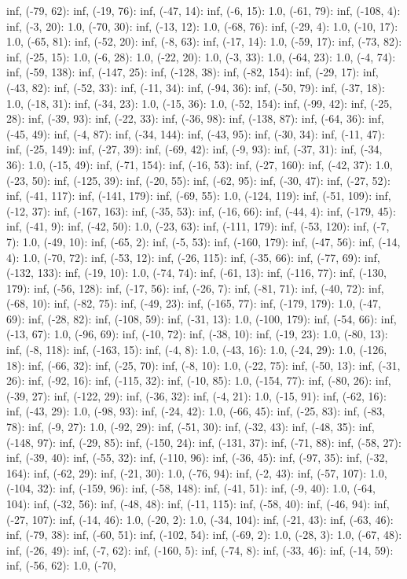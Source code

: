 \documentclass[parskip=half]{scrartcl}
\begin{document}
inf, (-79, 62): inf, (-19, 76): inf, (-47, 14): inf, (-6, 15): 1.0, (-61, 79): inf, (-108, 4): inf, (-3, 20): 1.0, (-70, 30): inf, (-13, 12): 1.0, (-68, 76): inf, (-29, 4): 1.0, (-10, 17): 1.0, (-65, 81): inf, (-52, 20): inf, (-8, 63): inf, (-17, 14): 1.0, (-59, 17): inf, (-73, 82): inf, (-25, 15): 1.0, (-6, 28): 1.0, (-22, 20): 1.0, (-3, 33): 1.0, (-64, 23): 1.0, (-4, 74): inf, (-59, 138): inf, (-147, 25): inf, (-128, 38): inf, (-82, 154): inf, (-29, 17): inf, (-43, 82): inf, (-52, 33): inf, (-11, 34): inf, (-94, 36): inf, (-50, 79): inf, (-37, 18): 1.0, (-18, 31): inf, (-34, 23): 1.0, (-15, 36): 1.0, (-52, 154): inf, (-99, 42): inf, (-25, 28): inf, (-39, 93): inf, (-22, 33): inf, (-36, 98): inf, (-138, 87): inf, (-64, 36): inf, (-45, 49): inf, (-4, 87): inf, (-34, 144): inf, (-43, 95): inf, (-30, 34): inf, (-11, 47): inf, (-25, 149): inf, (-27, 39): inf, (-69, 42): inf, (-9, 93): inf, (-37, 31): inf, (-34, 36): 1.0, (-15, 49): inf, (-71, 154): inf, (-16, 53): inf, (-27, 160): inf, (-42, 37): 1.0, (-23, 50): inf, (-125, 39): inf, (-20, 55): inf, (-62, 95): inf, (-30, 47): inf, (-27, 52): inf, (-41, 117): inf, (-141, 179): inf, (-69, 55): 1.0, (-124, 119): inf, (-51, 109): inf, (-12, 37): inf, (-167, 163): inf, (-35, 53): inf, (-16, 66): inf, (-44, 4): inf, (-179, 45): inf, (-41, 9): inf, (-42, 50): 1.0, (-23, 63): inf, (-111, 179): inf, (-53, 120): inf, (-7, 7): 1.0, (-49, 10): inf, (-65, 2): inf, (-5, 53): inf, (-160, 179): inf, (-47, 56): inf, (-14, 4): 1.0, (-70, 72): inf, (-53, 12): inf, (-26, 115): inf, (-35, 66): inf, (-77, 69): inf, (-132, 133): inf, (-19, 10): 1.0, (-74, 74): inf, (-61, 13): inf, (-116, 77): inf, (-130, 179): inf, (-56, 128): inf, (-17, 56): inf, (-26, 7): inf, (-81, 71): inf, (-40, 72): inf, (-68, 10): inf, (-82, 75): inf, (-49, 23): inf, (-165, 77): inf, (-179, 179): 1.0, (-47, 69): inf, (-28, 82): inf, (-108, 59): inf, (-31, 13): 1.0, (-100, 179): inf, (-54, 66): inf, (-13, 67): 1.0, (-96, 69): inf, (-10, 72): inf, (-38, 10): inf, (-19, 23): 1.0, (-80, 13): inf, (-8, 118): inf, (-163, 15): inf, (-4, 8): 1.0, (-43, 16): 1.0, (-24, 29): 1.0, (-126, 18): inf, (-66, 32): inf, (-25, 70): inf, (-8, 10): 1.0, (-22, 75): inf, (-50, 13): inf, (-31, 26): inf, (-92, 16): inf, (-115, 32): inf, (-10, 85): 1.0, (-154, 77): inf, (-80, 26): inf, (-39, 27): inf, (-122, 29): inf, (-36, 32): inf, (-4, 21): 1.0, (-15, 91): inf, (-62, 16): inf, (-43, 29): 1.0, (-98, 93): inf, (-24, 42): 1.0, (-66, 45): inf, (-25, 83): inf, (-83, 78): inf, (-9, 27): 1.0, (-92, 29): inf, (-51, 30): inf, (-32, 43): inf, (-48, 35): inf, (-148, 97): inf, (-29, 85): inf, (-150, 24): inf, (-131, 37): inf, (-71, 88): inf, (-58, 27): inf, (-39, 40): inf, (-55, 32): inf, (-110, 96): inf, (-36, 45): inf, (-97, 35): inf, (-32, 164): inf, (-62, 29): inf, (-21, 30): 1.0, (-76, 94): inf, (-2, 43): inf, (-57, 107): 1.0, (-104, 32): inf, (-159, 96): inf, (-58, 148): inf, (-41, 51): inf, (-9, 40): 1.0, (-64, 104): inf, (-32, 56): inf, (-48, 48): inf, (-11, 115): inf, (-58, 40): inf, (-46, 94): inf, (-27, 107): inf, (-14, 46): 1.0, (-20, 2): 1.0, (-34, 104): inf, (-21, 43): inf, (-63, 46): inf, (-79, 38): inf, (-60, 51): inf, (-102, 54): inf, (-69, 2): 1.0, (-28, 3): 1.0, (-67, 48): inf, (-26, 49): inf, (-7, 62): inf, (-160, 5): inf, (-74, 8): inf, (-33, 46): inf, (-14, 59): inf, (-56, 62): 1.0, (-70, 
\end{document}
